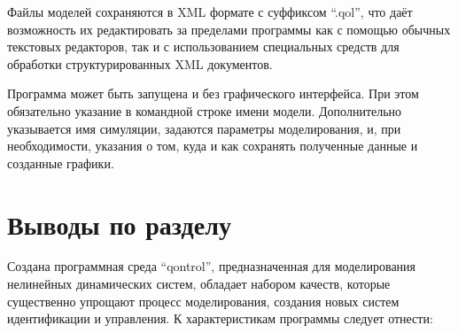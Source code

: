 Файлы моделей сохраняются в
XML формате с суффиксом ``.qol'', что даёт возможность их редактировать за пределами программы
как с помощью обычных текстовых редакторов, так и с использованием
специальных средств для обработки структурированных XML документов.


Программа может быть запущена и без графического интерфейса.
При этом обязательно указание в командной строке
имени модели. Дополнительно указывается имя симуляции,
задаются параметры моделирования, и, при необходимости,
указания о том, куда и как сохранять полученные данные и
созданные графики.



\section{Выводы по разделу \thechapter} %

Создана программная среда ``qontrol'', предназначенная для моделирования
нелинейных динамических систем, обладает набором качеств,
которые существенно упрощают процесс моделирования,
создания новых систем идентификации и управления.
К характеристикам программы следует отнести:

